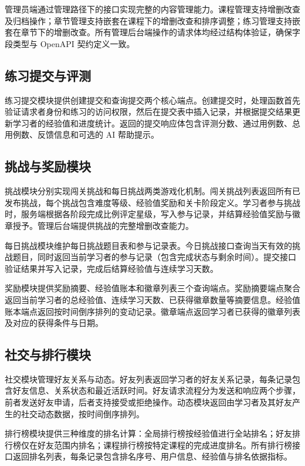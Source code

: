 管理员端通过管理路径下的接口实现完整的内容管理能力。课程管理支持增删改查及归档操作；章节管理支持嵌套在课程下的增删改查和排序调整；练习管理支持嵌套在章节下的增删改查。所有管理后台端操作的请求体均经过结构体验证，确保字段类型与 OpenAPI 契约定义一致。

\subsection{练习提交与评测}

练习提交模块提供创建提交和查询提交两个核心端点。创建提交时，处理函数首先验证请求者身份和练习的访问权限，然后在提交表中插入记录，并根据提交结果更新学习者的经验值和进度统计。返回的提交响应体包含评测分数、通过用例数、总用例数、反馈信息和可选的 AI 帮助提示。

\subsection{挑战与奖励模块}

挑战模块分别实现闯关挑战和每日挑战两类游戏化机制。闯关挑战列表返回所有已发布挑战，每个挑战包含难度等级、经验值奖励和关卡阶段定义。学习者参与挑战时，服务端根据各阶段完成比例评定星级，写入参与记录，并结算经验值奖励与徽章授予。管理后台端提供挑战的完整增删改查能力。

每日挑战模块维护每日挑战题目表和参与记录表。今日挑战接口查询当天有效的挑战题目，同时返回当前学习者的参与记录（包含完成状态与剩余时间）。提交接口验证结果并写入记录，完成后结算经验值与连续学习天数。

奖励模块提供奖励摘要、经验值账本和徽章列表三个查询端点。奖励摘要端点聚合返回当前学习者的总经验值、连续学习天数、已获得徽章数量等摘要信息。经验值账本端点返回按时间倒序排列的变动记录。徽章端点返回学习者已获得的徽章列表及对应的获得条件与日期。

\subsection{社交与排行模块}

社交模块管理好友关系与动态。好友列表返回学习者的好友关系记录，每条记录包含好友信息、关系状态和最近活跃时间。好友请求流程分为发送和响应两个步骤，前者发送好友申请，后者支持接受或拒绝操作。动态模块返回由学习者及其好友产生的社交动态数据，按时间倒序排列。

排行榜模块提供三种维度的排名计算：全局排行榜按经验值进行全站排名；好友排行榜仅在好友范围内排名；课程排行榜按特定课程的完成进度排名。所有排行榜接口返回排名列表，每条记录包含排名序号、用户信息、经验值与排名依据指标。

